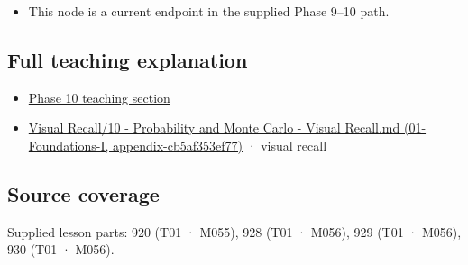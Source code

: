 \begin{itemize}
\tightlist
\item
  This node is a current endpoint in the supplied Phase 9--10 path.
\end{itemize}

\subsection{Full teaching explanation}\label{appendix-f0437ea55a47-full-teaching-explanation}

\begin{itemize}
\tightlist
\item
  \hyperref[02-foundations-ii-ch024-waiting-times-event-counts-and-covariance-geometry]{Phase 10 teaching section}
\item
  \href{../01-Foundations-I/main.pdf\#nameddest=appendix-cb5af353ef77}{Visual Recall/10 - Probability and Monte Carlo - Visual Recall.md (01-Foundations-I, appendix-cb5af353ef77)} · visual recall
\end{itemize}

\subsection{Source coverage}\label{appendix-f0437ea55a47-source-coverage}

Supplied lesson parts: 920 (T01 · M055), 928 (T01 · M056), 929 (T01 · M056), 930 (T01 · M056).
